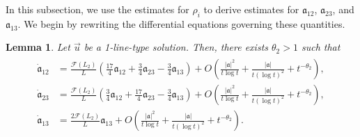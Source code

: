 \documentclass[reqno]{amsart}
\theoremstyle{plain}
\newtheorem{lemma}[theorem]{Lemma}
\theoremstyle{definition}
\numberwithin{equation}{section}
\begin{document}
In this subsection, we use the estimates for $\rho_i$ to derive estimates for $\mathfrak{a}_{12}$, $\mathfrak{a}_{23}$, and $\mathfrak{a}_{13}$. We begin by rewriting the differential equations governing these quantities.

\begin{lemma}\label{naisekiodekantan}
Let $\vec{u}$ be a 1-line-type solution. Then, there exists $\theta_2>1$ such that 
\begin{align}\label{kinenaisekiode2}
\begin{aligned}
\dot{\mathfrak{a}}_{12}&=\frac{\mathcal{F}(L_2)}{L}\left(\frac{17}{4}\mathfrak{a}_{12}+\frac{3}{4}\mathfrak{a}_{23}-\frac{3}{4}\mathfrak{a}_{13}\right)+O\left(\frac{|\mathfrak{a}|^2}{t\log{t}}+\frac{|\mathfrak{a}|}{t(\log{t})^2}+t^{-\theta_2}\right),
\\
\dot{\mathfrak{a}}_{23}&=\frac{\mathcal{F}(L_2)}{L}\left(\frac{3}{4}\mathfrak{a}_{12}+\frac{17}{4}\mathfrak{a}_{23}-\frac{3}{4}\mathfrak{a}_{13}\right)+O\left(\frac{|\mathfrak{a}|^2}{t\log{t}}+\frac{|\mathfrak{a}|}{t(\log{t})^2}+t^{-\theta_2}\right),
\\
\dot{\mathfrak{a}}_{13}&=\frac{2\mathcal{F}(L_2)}{L}\mathfrak{a}_{13}+O\left(\frac{|\mathfrak{a}|^2}{t\log{t}}+\frac{|\mathfrak{a}|}{t(\log{t})^2}+t^{-\theta_2}\right).
\end{aligned}
\end{align}
\end{lemma}
\end{document}
